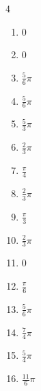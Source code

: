 \begin{multicols}{4}
\begin{enumerate}
\columnbreak %

\resetques

  \item $\displaystyle 0$

  \item $\displaystyle 0$

  \item $\displaystyle \frac{5}{6}\pi$

  \item $\displaystyle \frac{5}{6}\pi$

  \item $\displaystyle \frac{5}{3}\pi$

  \item $\displaystyle \frac{2}{3}\pi$

  \item $\displaystyle \frac{\pi}{4}$

  \item $\displaystyle \frac{2}{3}\pi$

  \item $\displaystyle \frac{\pi}{3}$

  \item $\displaystyle \frac{2}{3}\pi$

  \item $\displaystyle 0$

  \item $\displaystyle \frac{\pi}{6}$

  \item $\displaystyle \frac{5}{6}\pi$

  \item $\displaystyle \frac{7}{4}\pi$

  \item $\displaystyle \frac{5}{4}\pi$

  \item $\displaystyle \frac{11}{6}\pi$


\end{enumerate}
\end{multicols}

